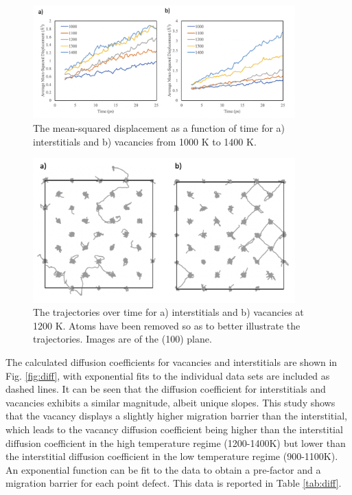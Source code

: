\documentclass[review]{elsarticle}
\begin{document}
 \begin{figure}[h]
 \centering
 \includegraphics[width=0.9\textwidth]{6_msd.png} 
 \caption{The mean-squared displacement as a function of time for a) interstitials and b) vacancies from 1000 K to 1400 K.  }
 \label{fig:rsquare}
\end{figure}

 \begin{figure}[h]
 \centering
 \includegraphics[width=0.9\textwidth]{7_trajectories.png} 
 \caption{The trajectories over time for a) interstitials and b) vacancies at 1200 K. Atoms have been removed so as to better illustrate the trajectories. Images are of the (100) plane. }
 \label{fig:traject}
\end{figure}

\FloatBarrier

The calculated diffusion coefficients for vacancies and interstitials are shown in Fig. \ref{fig:diff}, with exponential fits to the individual data sets are included as dashed lines. It can be seen that the diffusion coefficient for interstitials and vacancies exhibits a similar magnitude, albeit unique slopes. This study shows that the vacancy displays a slightly higher migration barrier than the interstitial, which leads to the vacancy diffusion coefficient being higher than the interstitial diffusion coefficient in the high temperature regime (1200-1400K) but lower than the interstitial diffusion coefficient in the low temperature regime (900-1100K).  An exponential function can be fit to the data to obtain a pre-factor and a migration barrier for each point defect. This data is reported in Table \ref{tab:diff}. 
\end{document}
